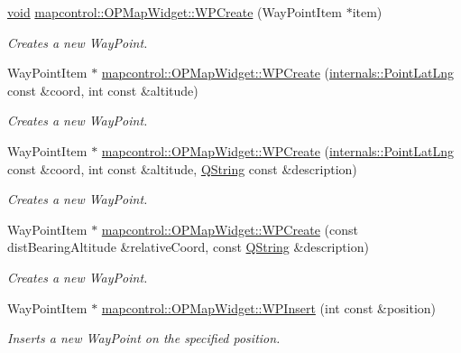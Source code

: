\begin{DoxyCompactItemize}
\hyperlink{group___u_a_v_objects_plugin_ga444cf2ff3f0ecbe028adce838d373f5c}{void} \hyperlink{group___o_p_map_widget_gaf4409d0e8417e7cce528af31cef4dfe4}{mapcontrol\-::\-O\-P\-Map\-Widget\-::\-W\-P\-Create} (\-Way\-Point\-Item $\ast$item)
\begin{DoxyCompactList}\small\item\em \-Creates a new \-Way\-Point. \end{DoxyCompactList}\item 
\-Way\-Point\-Item $\ast$ \hyperlink{group___o_p_map_widget_gac17ec2fbbcf0065570ad8d8568729521}{mapcontrol\-::\-O\-P\-Map\-Widget\-::\-W\-P\-Create} (\hyperlink{structinternals_1_1_point_lat_lng}{internals\-::\-Point\-Lat\-Lng} const \&coord, int const \&altitude)
\begin{DoxyCompactList}\small\item\em \-Creates a new \-Way\-Point. \end{DoxyCompactList}\item 
\-Way\-Point\-Item $\ast$ \hyperlink{group___o_p_map_widget_gae95af6f438774b8cddf4b8b4d670483c}{mapcontrol\-::\-O\-P\-Map\-Widget\-::\-W\-P\-Create} (\hyperlink{structinternals_1_1_point_lat_lng}{internals\-::\-Point\-Lat\-Lng} const \&coord, int const \&altitude, \hyperlink{group___u_a_v_objects_plugin_gab9d252f49c333c94a72f97ce3105a32d}{\-Q\-String} const \&description)
\begin{DoxyCompactList}\small\item\em \-Creates a new \-Way\-Point. \end{DoxyCompactList}\item 
\-Way\-Point\-Item $\ast$ \hyperlink{group___o_p_map_widget_ga950bec7a5d536f5adeddf3f2db2ee98f}{mapcontrol\-::\-O\-P\-Map\-Widget\-::\-W\-P\-Create} (const dist\-Bearing\-Altitude \&relative\-Coord, const \hyperlink{group___u_a_v_objects_plugin_gab9d252f49c333c94a72f97ce3105a32d}{\-Q\-String} \&description)
\begin{DoxyCompactList}\small\item\em \-Creates a new \-Way\-Point. \end{DoxyCompactList}\item 
\-Way\-Point\-Item $\ast$ \hyperlink{group___o_p_map_widget_ga44d46fc77045a7ac6011ebda19204c43}{mapcontrol\-::\-O\-P\-Map\-Widget\-::\-W\-P\-Insert} (int const \&position)
\begin{DoxyCompactList}\small\item\em \-Inserts a new \-Way\-Point on the specified position. \end{DoxyCompactList}\item 

\end{DoxyCompactItemize}

